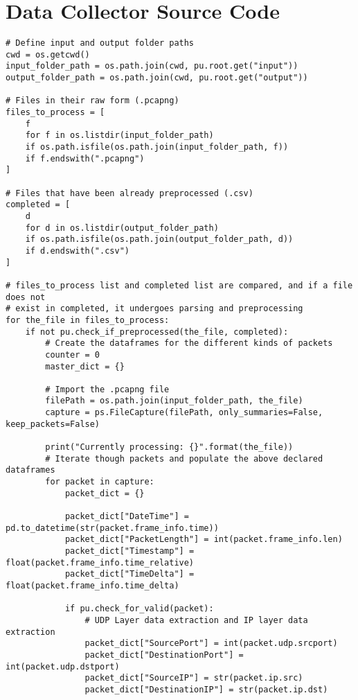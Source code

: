 \section{Data Collector Source Code}
\begin{verbatim}
# Define input and output folder paths
cwd = os.getcwd()
input_folder_path = os.path.join(cwd, pu.root.get("input"))
output_folder_path = os.path.join(cwd, pu.root.get("output"))

# Files in their raw form (.pcapng)
files_to_process = [
    f
    for f in os.listdir(input_folder_path)
    if os.path.isfile(os.path.join(input_folder_path, f))
    if f.endswith(".pcapng")
]

# Files that have been already preprocessed (.csv)
completed = [
    d
    for d in os.listdir(output_folder_path)
    if os.path.isfile(os.path.join(output_folder_path, d))
    if d.endswith(".csv")
]

# files_to_process list and completed list are compared, and if a file does not
# exist in completed, it undergoes parsing and preprocessing
for the_file in files_to_process:
    if not pu.check_if_preprocessed(the_file, completed):
        # Create the dataframes for the different kinds of packets
        counter = 0
        master_dict = {}

        # Import the .pcapng file
        filePath = os.path.join(input_folder_path, the_file)
        capture = ps.FileCapture(filePath, only_summaries=False, keep_packets=False)

        print("Currently processing: {}".format(the_file))
        # Iterate though packets and populate the above declared dataframes
        for packet in capture:
            packet_dict = {}

            packet_dict["DateTime"] = pd.to_datetime(str(packet.frame_info.time))
            packet_dict["PacketLength"] = int(packet.frame_info.len)
            packet_dict["Timestamp"] = float(packet.frame_info.time_relative)
            packet_dict["TimeDelta"] = float(packet.frame_info.time_delta)

            if pu.check_for_valid(packet):
                # UDP Layer data extraction and IP layer data extraction
                packet_dict["SourcePort"] = int(packet.udp.srcport)
                packet_dict["DestinationPort"] = int(packet.udp.dstport)
                packet_dict["SourceIP"] = str(packet.ip.src)
                packet_dict["DestinationIP"] = str(packet.ip.dst)


\end{verbatim}
